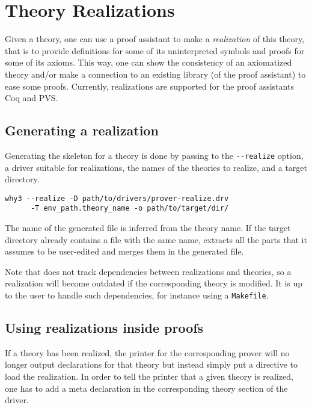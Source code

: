 \chapter{Theory Realizations}
\label{chap:realizations}

Given a \why theory, one can use a proof assistant to make a
\emph{realization} of this theory, that is to provide definitions for
some of its uninterpreted symbols and proofs for some of its
axioms. This way, one can show the consistency of an axiomatized
theory and/or make a connection to an existing library (of the proof
assistant) to ease some proofs.
Currently, realizations are supported for the proof assistants Coq and PVS.

\section{Generating a realization}

Generating the skeleton for a theory is done by passing to \why the
\verb+--realize+ option, a driver suitable for realizations, the names of
the theories to realize, and a target directory.

\begin{verbatim}
why3 --realize -D path/to/drivers/prover-realize.drv
      -T env_path.theory_name -o path/to/target/dir/
\end{verbatim}

The name of the generated file is inferred from the theory name. If the
target directory already contains a file with the same name, \why
extracts all the parts that it assumes to be user-edited and merges them in
the generated file.

Note that \why does not track dependencies between realizations and
theories, so a realization will become outdated if the corresponding
theory is modified.
It is up to the user to handle such dependencies, for instance using a
\texttt{Makefile}.

\section{Using realizations inside proofs}

If a theory has been realized, the \why printer for the corresponding prover
will no longer output declarations for that theory but instead simply put
a directive to load the realization. In order to tell the printer
that a given theory is realized, one has to add a meta declaration in the
corresponding theory section of the driver.

